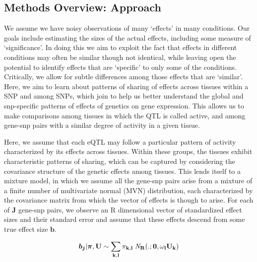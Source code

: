 \subsection{Methods Overview: Approach} 

We assume we have noisy observations of many `effects' in many  conditions. Our goals include estimating the sizes of the actual effects, including some measure of `significance'. In doing this we aim to exploit the fact that effects in different conditions may often be similar though not identical, while leaving open the potential to identify effects that are `specific' to only some of the conditions. Critically, we allow for subtle differences among those effects that are `similar'.  Here, we aim to learn about patterns of sharing of effects across tissues within a SNP and among SNPs, which join to help us better understand the global and snp-specific patterns of effects of genetics on gene expression. This allows us to make comparisons among tissues in which the QTL is called active, and among gene-snp pairs with a similar degree of activity in a given tissue. 

Here, we assume that each eQTL may follow a particular pattern of activity characterized by its effects across tissues. Within these groups, the tissues exhibit characteristic patterns of sharing, which can be captured by considering the covariance structure of the genetic effects among tissues. This lends itself to a mixture model, in which  we assume all the gene-snp pairs arise from a mixture of a finite number of multivariate normal (MVN) distribution, each characterized by the covariance matrix from which the vector of effects is though to arise. For each of $\textbf{J}$ gene-snp pairs, we observe an R dimensional vector of standardized effect sizes %
and their standard error and assume that these effects descend from some true effect size $\bm{b}$. 



 \begin{equation}
  \bm{b_{j}} | \bm{\pi},\bf{U} \sim \sum_{k,l} \pi_{k,l} \;{\it N}_R(.;\bm{0}, \omega_l U_{k})
  \label{eqn:mixprior}
\end{equation}

